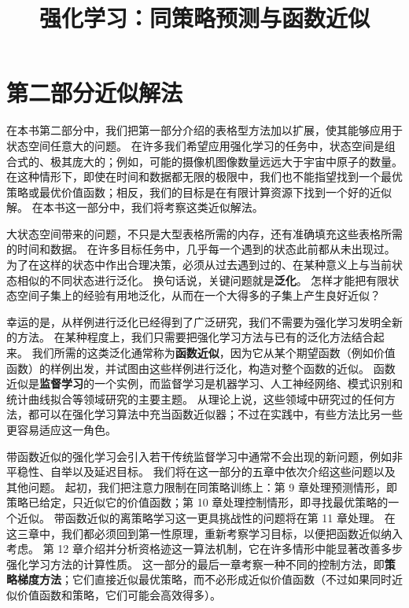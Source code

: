 \documentclass[UTF8,12pt,a4paper,fontset=fandol]{ctexart}
\title{强化学习：同策略预测与函数近似}
\author{}
\date{}
\begin{document}
\maketitle

\section*{第二部分\quad 近似解法}

在本书第二部分中，我们把第一部分介绍的表格型方法加以扩展，使其能够应用于状态空间任意大的问题。
在许多我们希望应用强化学习的任务中，状态空间是组合式的、极其庞大的；例如，可能的摄像机图像数量远远大于宇宙中原子的数量。
在这种情形下，即使在时间和数据都无限的极限中，我们也不能指望找到一个最优策略或最优价值函数；相反，我们的目标是在有限计算资源下找到一个好的近似解。
在本书这一部分中，我们将考察这类近似解法。

大状态空间带来的问题，不只是大型表格所需的内存，还有准确填充这些表格所需的时间和数据。
在许多目标任务中，几乎每一个遇到的状态此前都从未出现过。
为了在这样的状态中作出合理决策，必须从过去遇到过的、在某种意义上与当前状态相似的不同状态进行泛化。
换句话说，关键问题就是\textbf{泛化}。
怎样才能把有限状态空间子集上的经验有用地泛化，从而在一个大得多的子集上产生良好近似？

幸运的是，从样例进行泛化已经得到了广泛研究，我们不需要为强化学习发明全新的方法。
在某种程度上，我们只需要把强化学习方法与已有的泛化方法结合起来。
我们所需的这类泛化通常称为\textbf{函数近似}，因为它从某个期望函数（例如价值函数）的样例出发，并试图由这些样例进行泛化，构造对整个函数的近似。
函数近似是\textbf{监督学习}的一个实例，而监督学习是机器学习、人工神经网络、模式识别和统计曲线拟合等领域研究的主要主题。
从理论上说，这些领域中研究过的任何方法，都可以在强化学习算法中充当函数近似器；不过在实践中，有些方法比另一些更容易适应这一角色。

带函数近似的强化学习会引入若干传统监督学习中通常不会出现的新问题，例如非平稳性、自举以及延迟目标。
我们将在这一部分的五章中依次介绍这些问题以及其他问题。
起初，我们把注意力限制在同策略训练上：第 9 章处理预测情形，即策略已给定，只近似它的价值函数；第 10 章处理控制情形，即寻找最优策略的一个近似。
带函数近似的离策略学习这一更具挑战性的问题将在第 11 章处理。
在这三章中，我们都必须回到第一性原理，重新考察学习目标，以便把函数近似纳入考虑。
第 12 章介绍并分析资格迹这一算法机制，它在许多情形中能显著改善多步强化学习方法的计算性质。
这一部分的最后一章考察一种不同的控制方法，即\textbf{策略梯度方法}；它们直接近似最优策略，而不必形成近似价值函数（不过如果同时近似价值函数和策略，它们可能会高效得多）。
\end{document}
